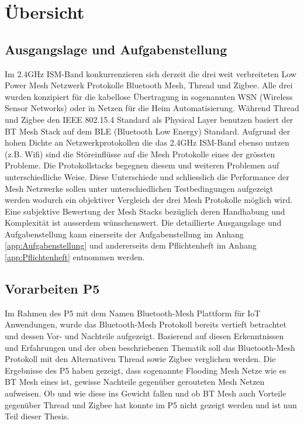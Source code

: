 \clearpage

\section{Übersicht}\label{sec:Uebersicht}

\subsection{Ausgangslage und Aufgabenstellung}\label{subsec:AusgangslageundAufgabenstellung}


Im 2.4GHz ISM-Band kon­kur­ren­zie­ren sich derzeit die drei weit verbreiteten Low Power Mesh Netzwerk Protokolle Bluetooth Mesh, Thread und Zigbee.
Alle drei wurden konzipiert für die kabellose Übertragung in sogenannten WSN (Wireless Sensor Networks) oder in Netzen für die Heim Automatisierung. Während Thread und Zigbee den IEEE 802.15.4 Standard als Physical Layer benutzen basiert der BT Mesh Stack auf dem BLE (Bluetooth Low Energy) Standard. Aufgrund der hohen Dichte an Netzwerkprotokollen die das 2.4GHz ISM-Band ebenso nutzen (z.B. Wifi) sind die Störeinflüsse auf die Mesh Protokolle eines der grössten Probleme. Die Protokollstacks begegnen diesem und weiteren Problemen auf unterschiedliche Weise. Diese Unterschiede und schliesslich die Performance der Mesh Netzwerke sollen unter unterschiedlichen Testbedingungen aufgezeigt werden wodurch ein objektiver Vergleich der drei Mesh Protokolle möglich wird. Eine subjektive Bewertung der Mesh Stacks bezüglich deren Handhabung und Komplexität ist ausserdem wünschenswert.
Die detaillierte Ausgangslage und Aufgabenstellung kann einerseits der Aufgabenstellung im Anhang \ref{app:Aufgabenstellung} und andererseits dem Pflichtenheft im Anhang \ref{app:Pflichtenheft} entnommen werden.

\subsection{Vorarbeiten P5}\label{subsec:VorarbeitenP5}

Im Rahmen des P5 mit dem Namen Bluetooth-Mesh Plattform für IoT Anwendungen, wurde das Bluetooth-Mesh Protokoll bereits vertieft betrachtet und dessen Vor- und Nachteile aufgezeigt. 
Basierend auf diesen Erkenntnissen und Erfahrungen und der oben beschriebenen Thematik soll das Bluetooth-Mesh Protokoll mit den Alternativen Thread sowie Zigbee verglichen werden.
Die Ergebnisse des P5 haben gezeigt, dass sogenannte Flooding Mesh Netze wie es BT Mesh eines ist, gewisse Nachteile gegenüber gerouteten Mesh Netzen aufweisen. Ob und wie diese ins Gewicht fallen und ob BT Mesh auch Vorteile gegenüber Thread und Zigbee hat konnte im P5 nicht gezeigt werden und ist nun Teil dieser Thesis.

